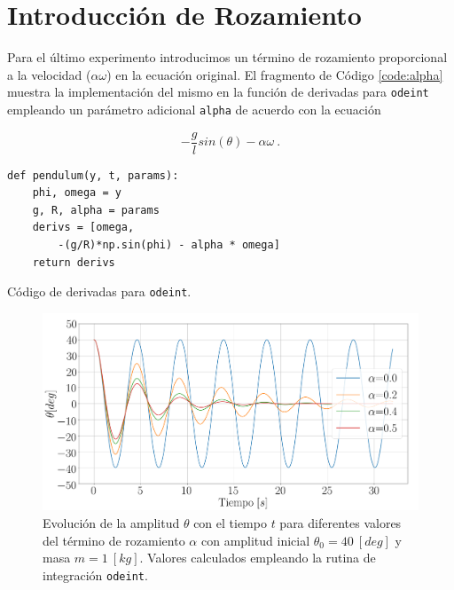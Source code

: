 \documentclass[journal]{IEEEtran}
\newenvironment{code}{\captionsetup{type=listing}}{\par\addvspace{\baselineskip}}
\begin{document}
\section{Introducción de Rozamiento}

Para el último experimento introducimos un término de rozamiento proporcional a la velocidad ($\alpha\omega$) en la ecuación original. El fragmento de Código \ref{code:alpha} muestra la implementación del mismo en la función de derivadas para \texttt{odeint} empleando un parámetro adicional \texttt{alpha} de acuerdo con la ecuación

\begin{equation}
  -\displaystyle\frac{g}{l} sin(\theta) - \alpha\omega~.
\end{equation}

\medskip

\begin{code}
  \begin{verbatim}
def pendulum(y, t, params):
    phi, omega = y
    g, R, alpha = params
    derivs = [omega,
        -(g/R)*np.sin(phi) - alpha * omega]
    return derivs
  \end{verbatim}
  \caption{Código de derivadas para \texttt{odeint}.}
  \label{code:alpha}
\end{code}


\begin{figure}[!htb]
  \centering
  \includegraphics[width=\linewidth]{alpha_m1}
  \caption{Evolución de la amplitud $\theta$ con el tiempo $t$ para diferentes valores del término de rozamiento $\alpha$ con amplitud inicial $\theta_0=40~[deg]$ y masa $m=1~[kg]$. Valores calculados empleando la rutina de integración \texttt{odeint}.}
  \label{fig:alpha_m1}
\end{figure}
\end{document}
